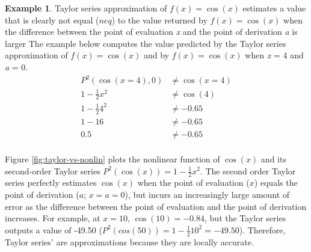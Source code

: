\documentclass[
12pt, %
twoside,
english]{guelphthesis}
\theoremstyle{definition}
\theoremstyle{definition}
\newtheorem{example}{Example}[chapter]
\theoremstyle{definition}
\theoremstyle{definition}
\theoremstyle{remark}
\begin{document}
\begin{example}
\noindent\textup{Taylor series approximation of $f(x) = \cos(x)$ estimates a value that is clearly not equal ($neq$) to the value returned by $f(x) = \cos(x)$ when the difference between the point of evaluation \textit{x} and the point of derivation \textit{a} is larger The example below computes the value predicted by the Taylor series approximation of $f(x) = \cos(x)$ and by $f(x) = \cos(x)$ when \textit{x} = 4 and  \textit{a} = 0.}
\begin{align*}
P^2(\cos(x = 4), 0) &\neq \cos(x = 4) \nonumber \\ 
1- \frac{1}{2}x^2 &\neq  \cos(4) \nonumber \\ 
1- \frac{1}{2}4^2 &\neq  -0.65 \nonumber \\ 
1- 16 &\neq  -0.65 \nonumber \\ 
0.5 &\neq  -0.65 \nonumber \\ 
\end{align*}
\vspace*{-25mm}

\noindent \hrulefill
\end{example}
\noindent Figure \ref{fig:taylor-vs-nonlin} plots the nonlinear function
of \(\cos(x)\) and its second-order Taylor series \(P^2(\cos(x)) = 1- \frac{1}{2}x^2\). The
second order Taylor series perfectly estimates \(\cos(x)\) when the point
of evaluation (\(x\)) equals the point of derivation (\(a\); \(x = a = 0\)),
but incurs an increasingly large amount of error as the difference
between the point of evaluation and the point of derivation increases.
For example, at \(x = 10\), \(\cos(10) = -0.84\), but the Taylor series
outputs a value of -49.50 (\(P^2(cos(50)) = 1- \frac{1}{2}10^2 = -49.50\)). Therefore, Taylor series' are approximations because they are locally accurate.
\end{document}

